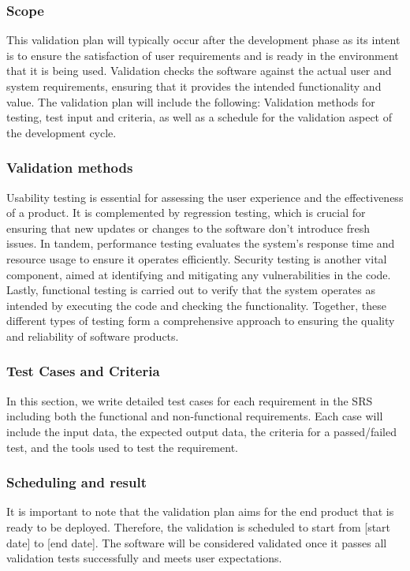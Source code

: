 \documentclass[12pt, titlepage]{article}
\begin{document}
    \subsubsection{Scope}
    This validation plan will typically occur after the development phase as its intent is to ensure the satisfaction of user requirements and is ready in the environment that it is being used. Validation checks the software against the actual user and system requirements, ensuring that it provides the intended functionality and value. The validation plan will include the following: Validation methods for testing, test input and criteria, as well as a schedule for the validation aspect of the development cycle.

    \subsubsection{Validation methods}
    Usability testing is essential for assessing the user experience and the effectiveness of a product. It is complemented by regression testing, which is crucial for ensuring that new updates or changes to the software don't introduce fresh issues. In tandem, performance testing evaluates the system's response time and resource usage to ensure it operates efficiently. Security testing is another vital component, aimed at identifying and mitigating any vulnerabilities in the code. Lastly, functional testing is carried out to verify that the system operates as intended by executing the code and checking the functionality. Together, these different types of testing form a comprehensive approach to ensuring the quality and reliability of software products.

    \subsubsection{Test Cases and Criteria}
    In this section, we write detailed test cases for each requirement in the SRS including both the functional and non-functional requirements. Each case will include the input data, the expected output data, the criteria for a passed/failed test, and the tools used to test the requirement.

    \subsubsection{Scheduling and result}
    It is important to note that the validation plan aims for the end product that is ready to be deployed. Therefore, the validation is scheduled to start from [start date] to [end date]. The software will be considered validated once it passes all validation tests successfully and meets user expectations.
\end{document}
